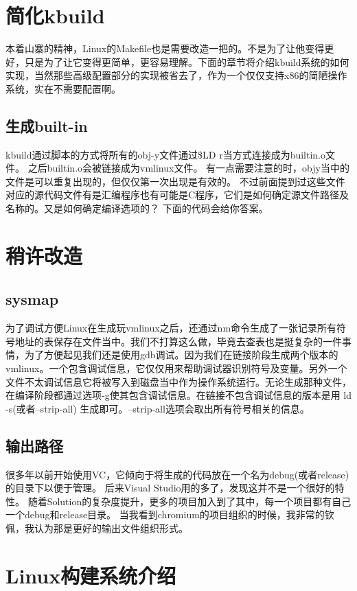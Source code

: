 \section{简化kbuild}
本着山寨的精神，Linux的Makefile也是需要改造一把的。不是为了让他变得更好，只是为了让它变得更简单，更容易理解。下面的章节将介绍kbuild系统的如何实现，当然那些高级配置部分的实现被省去了，作为一个仅仅支持x86的简陋操作系统，实在不需要配置啊。

\subsection{生成built-in}
kbuild通过脚本的方式将所有的obj-y文件通过\${LD} \-r当方式连接成为built\-in.o文件。
之后built\-in.o会被链接成为vmlinux文件。
有一点需要注意的时，obj\-y当中的文件是可以重复出现的，但仅仅第一次出现是有效的。
不过前面提到过这些文件对应的源代码文件有是汇编程序也有可能是C程序，它们是如何确定源文件路径及名称的。又是如何确定编译选项的？
下面的代码会给你答案。

\section{稍许改造}
\subsection{sysmap}
为了调试方便Linux在生成玩vmlinux之后，还通过nm命令生成了一张记录所有符号地址的表保存在文件当中。我们不打算这么做，毕竟去查表也是挺复杂的一件事情，为了方便起见我们还是使用gdb调试。因为我们在链接阶段生成两个版本的vmlinux。一个包含调试信息，它仅仅用来帮助调试器识别符号及变量。另外一个文件不太调试信息它将被写入到磁盘当中作为操作系统运行。无论生成那种文件，在编译阶段都通过选项-g使其包含调试信息。在链接不包含调试信息的版本是用 ld -s(或者--strip-all) 生成即可。--strip-all选项会取出所有符号相关的信息。
\subsection{输出路径}
很多年以前开始使用VC，它倾向于将生成的代码放在一个名为debug(或者release)的目录下以便于管理。
后来Visual Studio用的多了，发现这并不是一个很好的特性。
随着Solution的复杂度提升，更多的项目加入到了其中，每一个项目都有自己一个debug和release目录。
当我看到chromium的项目组织的时候，我非常的钦佩，我认为那是更好的输出文件组织形式。

\section{Linux构建系统介绍}
